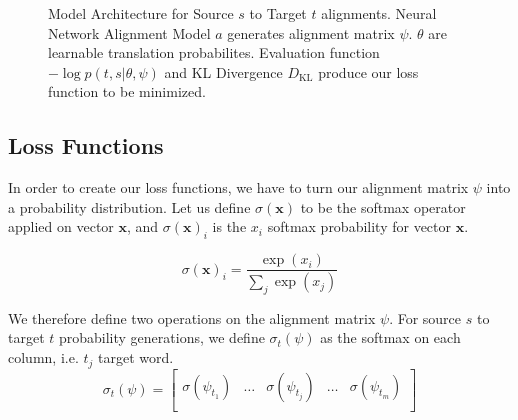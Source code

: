 \documentclass[twoside,twocolumn]{article}
\renewcommand{\vec}[1]{\mathbf{#1}}
\begin{document}
\begin{figure}
\centering
{}
\caption{Model Architecture for Source $s$ to Target $t$ alignments. Neural Network Alignment Model $a$ generates alignment matrix $\psi$. $\theta$ are learnable translation probabilites. Evaluation function $- \log p(t, s | \theta, \psi)$ and KL Divergence $D_{\mathrm{KL}}$ produce our loss function to be minimized.}
\end{figure}

\subsection{Loss Functions}
In order to create our loss functions, we have to turn our alignment matrix $\psi$ into a probability distribution. Let us define $\sigma(\vec{x})$ to be the softmax operator applied on vector $\vec{x}$, and $\sigma(\vec{x})_i$ is the $x_i$ softmax probability for vector $\vec{x}$.

\begin{equation}
\sigma(\vec{x})_i = \frac{\exp(x_i)}{\sum_j\exp(x_j)}
\end{equation}

We therefore define two operations on the alignment matrix $\psi$. For source $s$ to target $t$ probability generations, we define $\sigma_t(\psi)$ as the softmax on each column, i.e. $t_j$ target word.
\begin{equation}
  \sigma_t(\psi) = \left[
    \begin{matrix}
      \sigma(\psi_{t_1}) &
      \hdots &
      \sigma(\psi_{t_j}) &
      \hdots &
      \sigma(\psi_{t_m})  \\
    \end{matrix}
\right]
\end{equation}
\end{document}

